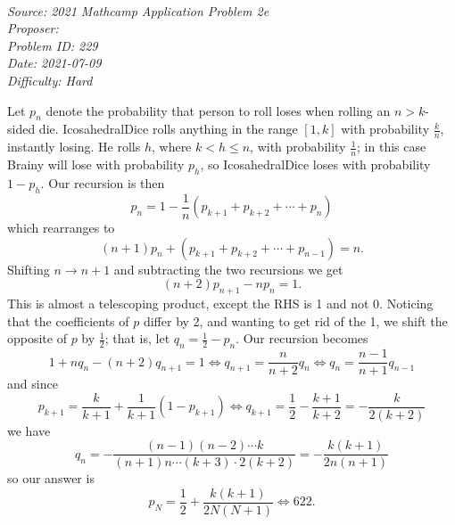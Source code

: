 \SSbreak\\
\emph{Source: 2021 Mathcamp Application Problem 2e}\\
\emph{Proposer: \Pchan}\\ %
\emph{Problem ID: 229}\\
\emph{Date: 2021-07-09}\\
\emph{Difficulty: Hard}\\
\SSbreak

\bigskip

\begin{solution}\hfil\medskip
  
    Let $p_n$ denote the probability that person to roll loses when rolling an $n > k$-sided die. 
    IcosahedralDice rolls anything in the range $[1, k]$ with probability $\frac{k}{n}$, instantly losing. 
    He rolls $h$, where $k < h \leq n$, with probability $\frac{1}{n}$; in this case Brainy will lose with probability 
    $p_h$, so IcosahedralDice loses with probability $1 - p_h$. Our recursion is then 
    $$p_n = 1 - \dfrac{1}{n}\left(p_{k + 1} + p_{k + 2} + \cdots + p_n\right)$$
    which rearranges to $$(n + 1)p_n + \left(p_{k + 1} + p_{k + 2} + \cdots + p_{n - 1}\right) = n.$$
    Shifting $n \to n + 1$ and subtracting the two recursions we get 
    $$(n + 2)p_{n + 1} - np_n = 1.$$
    This is almost a telescoping product, except the RHS is 1 and not 0. Noticing that the 
    coefficients of $p$ differ by 2, and wanting to get rid of the 1, we shift the opposite of $p$ by $\frac{1}{2}$; 
    that is, let $q_n = \frac{1}{2} - p_n$. Our recursion becomes 
    $$1 + nq_n - (n + 2)q_{n + 1} = 1 \iff q_{n + 1} = \dfrac{n}{n + 2}q_n \iff q_n = \dfrac{n - 1}{n + 1}q_{n - 1}$$
    and since $$p_{k + 1} = \dfrac{k}{k + 1} + \dfrac{1}{k + 1}\left(1 - p_{k + 1}\right) \iff q_{k + 1} = \dfrac{1}{2} - \dfrac{k + 1}{k + 2} = -\dfrac{k}{2(k + 2)}$$
    we have $$q_{n} = -\dfrac{(n - 1)(n - 2) \cdots k}{(n + 1)n \cdots (k + 3) \cdot 2(k + 2)} = -\dfrac{k(k + 1)}{2n(n + 1)}$$
    so our answer is $$p_N = \dfrac{1}{2} + \dfrac{k(k + 1)}{2N(N + 1)} \iff \boxed{622}.$$
\end{solution}\bigskip
